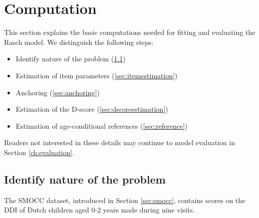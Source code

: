 \documentclass[
]{book}
\providecommand{\tightlist}{%
  \setlength{\itemsep}{0pt}\setlength{\parskip}{0pt}}
\begin{document}
\hypertarget{ch:computation}{%
\chapter{Computation}\label{ch:computation}}

This section explains the basic computations needed for fitting and evaluating the Rasch model. We distinguish the following steps:

\begin{itemize}
\tightlist
\item
  Identify nature of the problem (\ref{sec:datapreparation})
\item
  Estimation of item parameters (\ref{sec:itemestimation})
\item
  Anchoring (\ref{sec:anchoring})
\item
  Estimation of the D-score (\ref{sec:dscoreestimation})
\item
  Estimation of age-conditional references (\ref{sec:reference})
\end{itemize}

Readers not interested in these details may continue to model evaluation in Section \ref{ch:evaluation}.

\hypertarget{sec:datapreparation}{%
\section{Identify nature of the problem}\label{sec:datapreparation}}

The SMOCC dataset, introduced in Section \ref{sec:smocc}, contains scores on the DDI of Dutch children aged 0-2 years made during nine visits.
\end{document}
